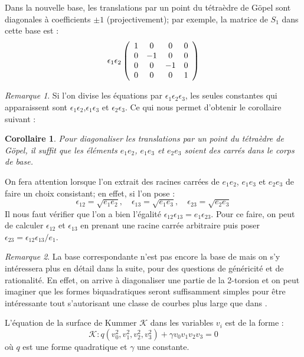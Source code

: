 \documentclass[a4paper]{article}
\newtheorem{corollaire}[theoreme]{Corollaire}
\theoremstyle{definition}
\theoremstyle{remark}
\newtheorem{remarque}{Remarque}
\numberwithin{equation}{section}
\begin{document}
Dans la nouvelle base, les translations par un point du tétraèdre de G\"opel sont diagonales à coefficients $\pm 1$ (projectivement); par exemple, la matrice de $S_1$ dans cette base est :
\[ \epsilon_1\epsilon_2
\left(
  \begin{array}{ c c c c}
     1 & 0 & 0  & 0  \\
     0 & -1   & 0  & 0  \\
     0 & 0   & -1  & 0 \\
     0 & 0   & 0  & 1  \\
  \end{array} \right)
\]

\begin{remarque}
Si l'on divise les équations par $\epsilon_1\epsilon_2\epsilon_3$, les seules constantes qui apparaissent sont $\epsilon_1\epsilon_2$,$\epsilon_1\epsilon_3$ et $\epsilon_2\epsilon_3$. Ce qui nous permet d'obtenir le corollaire suivant :
\end{remarque}

\begin{corollaire}
Pour diagonaliser les translations par un point du tétraèdre de G\"opel, il suffit que les éléments $e_1e_2$, $e_1e_3$ et $e_2e_3$ soient des carrés dans le corps de base.
\end{corollaire}

On fera attention lorsque l'on extrait des racines carrées de $e_1e_2$, $e_1e_3$ et $e_2e_3$ de faire un choix consistant; en effet, si l'on pose :
$$\epsilon_{12} = \sqrt{e_1e_2}, \quad \epsilon_{13} = \sqrt{e_1e_3}, \quad \epsilon_{23} = \sqrt{e_2e_3}$$
Il nous faut vérifier que l'on a bien l'égalité $\epsilon_{12}\epsilon_{13} = e_1\epsilon_{23}$.
Pour ce faire, on peut de calculer $\epsilon_{12}$ et $\epsilon_{13}$ en prenant une racine carrée arbitraire puis poser $\epsilon_{23} = \epsilon_{12}\epsilon_{13}/e_1$.

\begin{remarque}
La base correspondante n'est pas encore la base de \citet{gaudry} mais on s'y intéressera plus en détail dans la suite, pour des questions de généricité et de rationalité. En effet, on arrive à diagonaliser une partie de la 2-torsion et on peut imaginer que les formes biquadratiques seront suffisamment simples pour être intéressante tout s'autorisant une classe de courbes plus large que dans \citep{gaudry}.
\end{remarque}

L'équation de la surface de Kummer $\mathcal{K}$ dans les variables $v_i$ est de la forme \citep{cassels-Flynn} :
\begin{equation}
\label{eqKumDiag}
\mathcal{K} : q(v_0^2,v_1^2,v_2^2,v_3^2)+\gamma v_0v_1v_2v_3 = 0
\end{equation}
où $q$ est une forme quadratique et $\gamma$ une constante.
\end{document}
